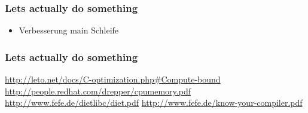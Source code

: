 \documentclass{beamer}
\begin{document}
\begin{frame}
    \frametitle{Lets actually do something}
    \begin{itemize}
        \item Verbesserung main Schleife
    \end{itemize}
\end{frame}

\begin{frame}
    \frametitle{Lets actually do something}
\end{frame}

\begin{frame}
    \url{http://leto.net/docs/C-optimization.php\#Compute-bound}
    \url{http://people.redhat.com/drepper/cpumemory.pdf}
    \url{http://www.fefe.de/dietlibc/diet.pdf}
    \url{http://www.fefe.de/know-your-compiler.pdf}
\end{frame}
\end{document}

